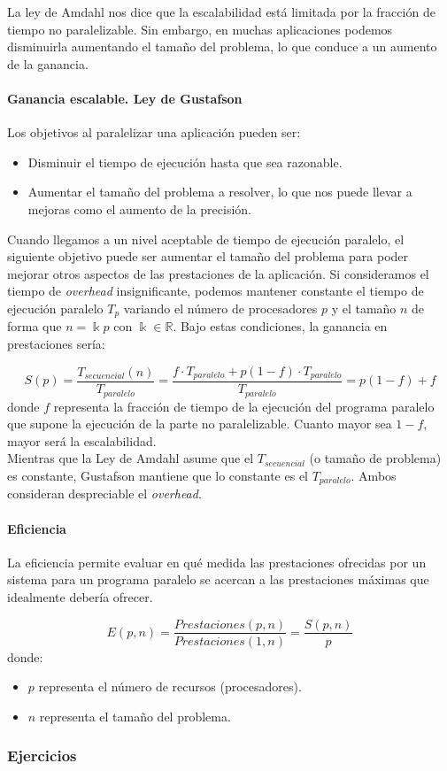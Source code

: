 \documentclass[12pt,spanish]{article}
\begin{document}
La ley de Amdahl nos dice que la escalabilidad está limitada por la fracción de tiempo no paralelizable. Sin embargo, en muchas aplicaciones podemos disminuirla aumentando el tamaño del problema, lo que conduce a un aumento de la ganancia.

\paragraph{Ganancia escalable. Ley de Gustafson}

Los objetivos al paralelizar una aplicación pueden ser:
\begin{itemize}
	\item Disminuir el tiempo de ejecución hasta que sea razonable.
	\item Aumentar el tamaño del problema a resolver, lo que nos puede llevar a mejoras como el aumento de la precisión.
\end{itemize}

Cuando llegamos a un nivel aceptable de tiempo de ejecución paralelo, el siguiente objetivo puede ser aumentar el tamaño del problema para poder mejorar otros aspectos de las prestaciones de la aplicación. Si consideramos el tiempo de \textit{overhead} insignificante, podemos mantener constante el tiempo de ejecución paralelo $T_p$ variando el número de procesadores $p$ y el tamaño $n$ de forma que $n=\Bbbk p$ con $\Bbbk \in \mathbb{R}$. Bajo estas condiciones, la ganancia en prestaciones sería:

\begin{equation}
S(p)=\frac{T_{secuencial}(n)}{T_{paralelo}}=\frac{f \cdot T_{paralelo} + p(1-f) \cdot T_{paralelo}}{T_{paralelo}}= p(1-f) + f
\end{equation}
donde $f$ representa la fracción de tiempo de la ejecución del programa paralelo que supone la ejecución de la parte no paralelizable. Cuanto mayor sea $1-f$, mayor será la escalabilidad.\\

Mientras que la Ley de Amdahl asume que el $T_{secuencial}$ (o tamaño de problema) es constante, Gustafson mantiene que lo constante es el $T_{paralelo}$. Ambos consideran despreciable el \textit{overhead}.

\paragraph{Eficiencia}

La eficiencia permite evaluar en qué medida las prestaciones ofrecidas por un sistema para un programa paralelo se acercan a las prestaciones máximas que idealmente debería ofrecer.

\begin{equation}
	E(p,n)=\frac{Prestaciones (p,n)}{Prestaciones (1,n)}=\frac{S(p,n)}{p}
\end{equation}
donde:
\begin{itemize}
	\item $p$ representa el número de recursos (procesadores).
	\item $n$ representa el tamaño del problema.
\end{itemize}


\subsubsection{Ejercicios}
\end{document}
